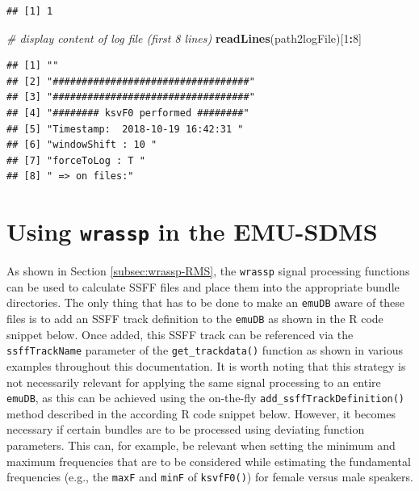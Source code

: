 \documentclass[]{book}
\newenvironment{Shaded}{\begin{snugshade}}{\end{snugshade}}
\newcommand{\CommentTok}[1]{\textcolor[rgb]{0.56,0.35,0.01}{\textit{#1}}}
\newcommand{\DecValTok}[1]{\textcolor[rgb]{0.00,0.00,0.81}{#1}}
\newcommand{\KeywordTok}[1]{\textcolor[rgb]{0.13,0.29,0.53}{\textbf{#1}}}
\newcommand{\NormalTok}[1]{#1}
\newcommand{\OperatorTok}[1]{\textcolor[rgb]{0.81,0.36,0.00}{\textbf{#1}}}
\theoremstyle{definition}
\theoremstyle{definition}
\theoremstyle{definition}
\theoremstyle{remark}
\begin{document}
\begin{verbatim}
## [1] 1
\end{verbatim}

\begin{Shaded}
\begin{Highlighting}[]
\CommentTok{# display content of log file (first 8 lines)}
\KeywordTok{readLines}\NormalTok{(path2logFile)[}\DecValTok{1}\OperatorTok{:}\DecValTok{8}\NormalTok{]}
\end{Highlighting}
\end{Shaded}

\begin{verbatim}
## [1] ""                                  
## [2] "##################################"
## [3] "##################################"
## [4] "######## ksvF0 performed ########" 
## [5] "Timestamp:  2018-10-19 16:42:31 "  
## [6] "windowShift : 10 "                 
## [7] "forceToLog : T "                   
## [8] " => on files:"
\end{verbatim}

\hypertarget{sec:wrassp-emu-sdms}{%
\section{\texorpdfstring{Using \texttt{wrassp} in the
EMU-SDMS}{Using wrassp in the EMU-SDMS}}\label{sec:wrassp-emu-sdms}}

As shown in Section \ref{subsec:wrassp-RMS}, the \texttt{wrassp} signal
processing functions can be used to calculate SSFF files and place them
into the appropriate bundle directories. The only thing that has to be
done to make an \texttt{emuDB} aware of these files is to add an SSFF
track definition to the \texttt{emuDB} as shown in the R code snippet
below. Once added, this SSFF track can be referenced via the
\texttt{ssffTrackName} parameter of the \texttt{get\_trackdata()}
function as shown in various examples throughout this documentation. It
is worth noting that this strategy is not necessarily relevant for
applying the same signal processing to an entire \texttt{emuDB}, as this
can be achieved using the on-the-fly \texttt{add\_ssffTrackDefinition()}
method described in the according R code snippet below. However, it
becomes necessary if certain bundles are to be processed using deviating
function parameters. This can, for example, be relevant when setting the
minimum and maximum frequencies that are to be considered while
estimating the fundamental frequencies (e.g., the \texttt{maxF} and
\texttt{minF} of \texttt{ksvfF0()}) for female versus male speakers.
\end{document}
